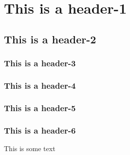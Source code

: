 \documentclass{article}
\begin{document}
\section*{This is a header-1}
\subsection*{This is a header-2}
\subsubsection*{This is a header-3}
\subsubsection*{This is a header-4}
\subsubsection*{This is a header-5}
\subsubsection*{This is a header-6}
This is some text
\end{document}
